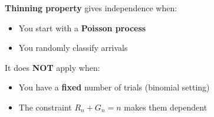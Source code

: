 \documentclass[12pt]{article}
\begin{document}
\vspace{1em}

\begin{tcolorbox}[colback=yellow!5!white,colframe=orange!75!black,title=Key Takeaway]
\textbf{Thinning property} gives independence when:
\begin{itemize}
    \item You start with a \textbf{Poisson process}
    \item You randomly classify arrivals
\end{itemize}

It does \textbf{NOT} apply when:
\begin{itemize}
    \item You have a \textbf{fixed} number of trials (binomial setting)
    \item The constraint $R_n + G_n = n$ makes them dependent
\end{itemize}
\end{tcolorbox}
\end{document}
